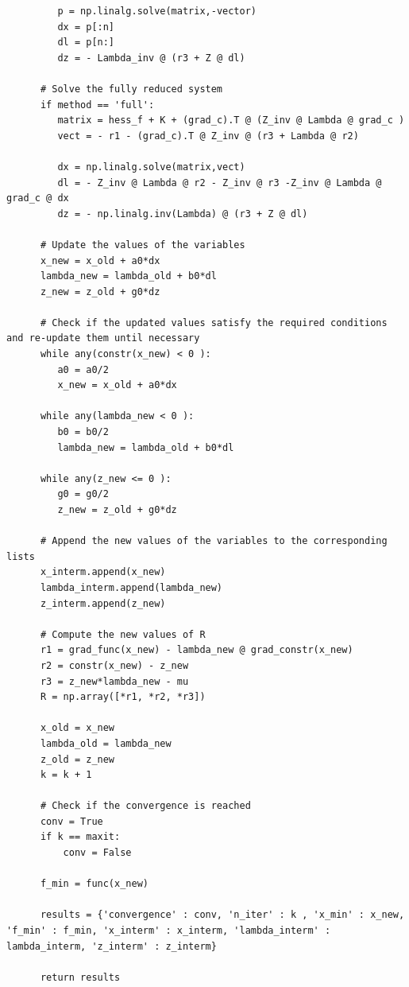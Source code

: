 \documentclass[a4paper,11pt]{article}
\begin{document}
\begin{verbatim}
         p = np.linalg.solve(matrix,-vector)
         dx = p[:n]
         dl = p[n:]
         dz = - Lambda_inv @ (r3 + Z @ dl)

      # Solve the fully reduced system
      if method == 'full':            
         matrix = hess_f + K + (grad_c).T @ (Z_inv @ Lambda @ grad_c )
         vect = - r1 - (grad_c).T @ Z_inv @ (r3 + Lambda @ r2)

         dx = np.linalg.solve(matrix,vect)
         dl = - Z_inv @ Lambda @ r2 - Z_inv @ r3 -Z_inv @ Lambda @ grad_c @ dx
         dz = - np.linalg.inv(Lambda) @ (r3 + Z @ dl)

      # Update the values of the variables
      x_new = x_old + a0*dx
      lambda_new = lambda_old + b0*dl
      z_new = z_old + g0*dz

      # Check if the updated values satisfy the required conditions and re-update them until necessary
      while any(constr(x_new) < 0 ):
         a0 = a0/2
         x_new = x_old + a0*dx

      while any(lambda_new < 0 ):
         b0 = b0/2
         lambda_new = lambda_old + b0*dl

      while any(z_new <= 0 ):
         g0 = g0/2
         z_new = z_old + g0*dz

      # Append the new values of the variables to the corresponding lists
      x_interm.append(x_new)
      lambda_interm.append(lambda_new)
      z_interm.append(z_new)

      # Compute the new values of R
      r1 = grad_func(x_new) - lambda_new @ grad_constr(x_new)
      r2 = constr(x_new) - z_new
      r3 = z_new*lambda_new - mu
      R = np.array([*r1, *r2, *r3])

      x_old = x_new
      lambda_old = lambda_new
      z_old = z_new
      k = k + 1

      # Check if the convergence is reached
      conv = True
      if k == maxit:
          conv = False

      f_min = func(x_new)

      results = {'convergence' : conv, 'n_iter' : k , 'x_min' : x_new, 'f_min' : f_min, 'x_interm' : x_interm, 'lambda_interm' : lambda_interm, 'z_interm' : z_interm}
      
      return results
\end{verbatim}
\end{document}
